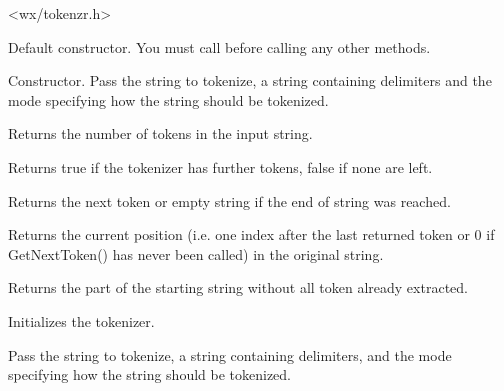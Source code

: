 


<wx/tokenzr.h>


\label{wxstringtokenizerwxstringtokenizer}


Default constructor. You must call 
 before calling any other
methods.


Constructor. Pass the string to tokenize, a string containing delimiters
and the mode specifying how the string should be tokenized.

\label{wxstringtokenizercounttokens}


Returns the number of tokens in the input string.

\label{wxstringtokenizerhasmoretokens}


Returns true if the tokenizer has further tokens, false if none are left.

\label{wxstringtokenizergetnexttoken}


Returns the next token or empty string if the end of string was reached.

\label{wxstringtokenizergetposition}


Returns the current position (i.e. one index after the last returned
token or 0 if GetNextToken() has never been called) in the original
string.

\label{wxstringtokenizergetstring}


Returns the part of the starting string without all token already extracted.

\label{wxstringtokenizersetstring}


Initializes the tokenizer.

Pass the string to tokenize, a string containing delimiters,
and the mode specifying how the string should be tokenized.


